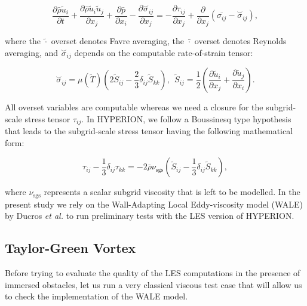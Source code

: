\begin{equation}
    \dfrac{\partial \bar\rho \tilde{u}_i}{\partial t} + \dfrac{\partial \bar\rho \tilde{u}_i\tilde{u}_j}{\partial x_j} + \dfrac{\partial \bar p}{\partial x_i} - \dfrac{\partial \overset{\smile}{\sigma}_{ij}}{\partial x_j} = -\dfrac{\partial \tau_{ij}}{\partial x_j} + \dfrac{\partial}{\partial x_j} \left( \overline{\sigma_{ij}} - \overset{\smile}{\sigma}_{ij}\right),
    \label{eq:les_momentum_eqns}
\end{equation}

where the $\tilde{\cdot}$ overset denotes Favre averaging, the $\bar\cdot$ overset denotes Reynolds averaging, and $\overset{\smile}{\sigma}_{ij}$ depends on the computable rate-of-strain tensor:

\begin{equation}
    \overset{\smile}{\sigma}_{ij} = \mu(\tilde{T}) \left( 2 \tilde{S}_{ij} - \dfrac{2}{3}\delta_{ij}\tilde{S}_{kk} \right),~~ \tilde{S}_{ij} = \dfrac{1}{2}\left( \dfrac{\partial\tilde{u}_i}{\partial x_j} + \dfrac{\partial \tilde{u}_j}{\partial x_i}\right).
    \label{eq:sigma_smile}
\end{equation}

All overset variables are computable whereas we need a closure for the subgrid-scale stress tensor $\tau_{ij}$.
In HYPERION, we follow a Boussinesq type hypothesis \cite{boussinesq1877essai} that leads to the subgrid-scale stress tensor having the following mathematical form:

\begin{equation}
    \tau_{ij} - \dfrac{1}{3}\delta_{ij}\tau_{kk} = - 2 \bar\rho \nu_{\text{sgs}} \left( \tilde{S}_{ij} - \dfrac{1}{3} \delta_{ij}\tilde{S}_{kk} \right),
    \label{eq:boussinesq_les}
\end{equation}

where $\nu_{\text{sgs}}$ represents a scalar subgrid viscosity that is left to be modelled.
In the present study we rely on the Wall-Adapting Local Eddy-viscosity model (WALE) by Ducros \emph{et al.} \cite{ducros1998wall} to run preliminary tests with the LES version of HYPERION.

\subsection{Taylor-Green Vortex}\label{ssec:test_tgv}

Before trying to evaluate the quality of the LES computations in the presence of immersed obstacles, let us run a very classical viscous test case that will allow us to check the implementation of the WALE model.

